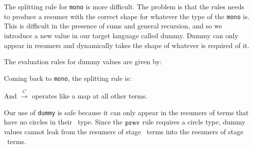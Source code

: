 The splitting rule for \texttt{mono} is more difficult.
The problem is that the rules needs to produce a resumer with the correct shape
for whatever the type of the \texttt{mono} is.
This is difficult in the presence of sums and general recursion,
and so we introduce a new value in our target language called dummy.
Dummy can only appear in resumers and dynamically takes the shape of whatever is required of it.

The evaluation rules for dummy values are given by:

Coming back to \texttt{mono}, the splitting rule is:
And $\overset{C}{\rightarrow}$ operates like a map at all other terms.

Our use of {\tt dummy} is safe because
it can only appear in the resumers of terms that have no circles in their \lang\ type.
Since the ${\tt prev}$ rule requires a circle type, dummy values cannot leak from
the resumers of stage \bbone\ terms into the resumers of stage \bbtwo\ terms.


